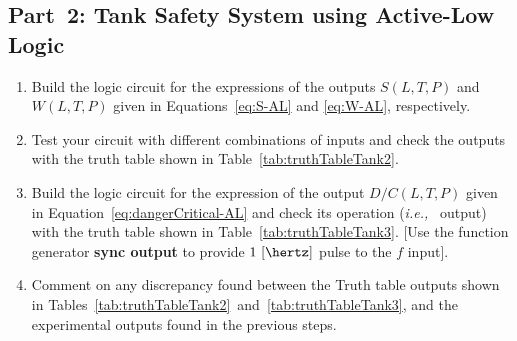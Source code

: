 \subsection{Part~2: Tank Safety System using Active-Low Logic}
\label{sec:part2}
\begin{enumerate}
\item Build the logic circuit for the expressions of the outputs $S(L,T,P)$ and $W(L,T,P)$ given in Equations~\eqref{eq:S-AL} and \eqref{eq:W-AL}, respectively. 
  
\item Test your circuit with different combinations of inputs and check the outputs with the truth table shown in Table~\ref{tab:truthTableTank2}.

\item Build the logic circuit for the expression of the output $D/C(L,T,P)$ given in Equation~\eqref{eq:dangerCritical-AL} and check its operation (\textit{i.e.,~} output) with  the truth table shown in Table~\ref{tab:truthTableTank3}. [Use  the function generator \textbf{sync output} to provide $1~[\hertz]$ pulse to the $f$ input].

\item Comment on any discrepancy found between the Truth table  outputs shown in Tables~\ref{tab:truthTableTank2}~and~\ref{tab:truthTableTank3}, and the experimental outputs found in the previous steps. 
\end{enumerate}







